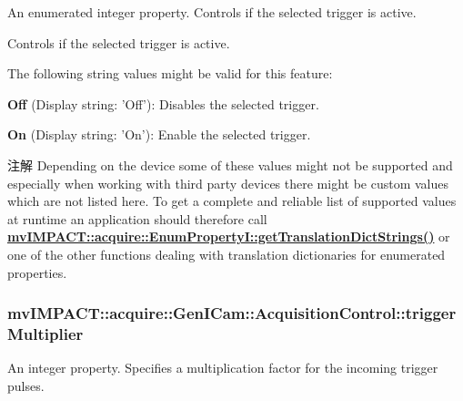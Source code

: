 An enumerated integer property. Controls if the selected trigger is active. 

Controls if the selected trigger is active.

The following string values might be valid for this feature\+:
\begin{DoxyItemize}
\item {\bfseries Off} (Display string\+: 'Off')\+: Disables the selected trigger.
\item {\bfseries On} (Display string\+: 'On')\+: Enable the selected trigger.
\end{DoxyItemize}

\begin{DoxyNote}{注解}
Depending on the device some of these values might not be supported and especially when working with third party devices there might be custom values which are not listed here. To get a complete and reliable list of supported values at runtime an application should therefore call {\bfseries \hyperlink{classmv_i_m_p_a_c_t_1_1acquire_1_1_enum_property_i_a0ba6ccbf5ee69784d5d0b537924d26b6}{mv\+I\+M\+P\+A\+C\+T\+::acquire\+::\+Enum\+Property\+I\+::get\+Translation\+Dict\+Strings()}} or one of the other functions dealing with translation dictionaries for enumerated properties. 
\end{DoxyNote}
\hypertarget{classmv_i_m_p_a_c_t_1_1acquire_1_1_gen_i_cam_1_1_acquisition_control_aeb5fac0df36681f7800f45f2068707b0}{
\subsubsection[{trigger\+Multiplier}]{ mv\+I\+M\+P\+A\+C\+T\+::acquire\+::\+Gen\+I\+Cam\+::\+Acquisition\+Control\+::trigger\+Multiplier}}\label{classmv_i_m_p_a_c_t_1_1acquire_1_1_gen_i_cam_1_1_acquisition_control_aeb5fac0df36681f7800f45f2068707b0}


An integer property. Specifies a multiplication factor for the incoming trigger pulses. 

